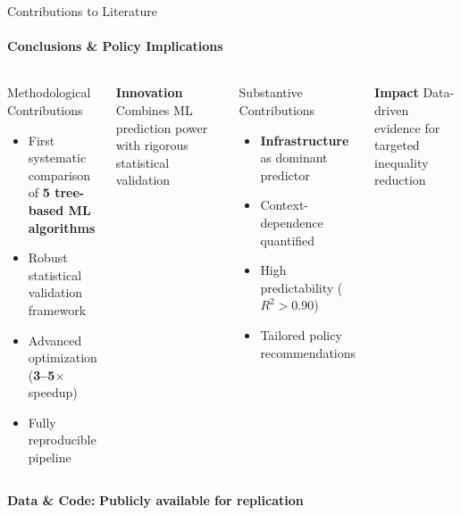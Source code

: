 \documentclass[aspectratio=169,8pt]{beamer}
\begin{document}
    \begin{frame}{Contributions to Literature}
        \framesubtitle{Conclusions \& Policy Implications}
        \begin{columns}[T]
            \begin{exampleblock}{Methodological Contributions}
                \begin{itemize}
                    \item First systematic comparison of \textbf{5 tree-based ML algorithms}
                    \item Robust statistical validation framework
                    \item Advanced optimization (\textbf{3--5$\times$} speedup)
                    \item Fully reproducible pipeline
                \end{itemize}
            \end{exampleblock}

            \vspace{0.15cm}
            \begin{alertblock}{\textbf{Innovation}}
                Combines ML prediction power with rigorous statistical validation
            \end{alertblock}

            \begin{exampleblock}{Substantive Contributions}
                \begin{itemize}
                    \item \textbf{Infrastructure} as dominant predictor
                    \item Context-dependence quantified
                    \item High predictability (\textbf{$R^2 > 0.90$})
                    \item Tailored policy recommendations
                \end{itemize}
            \end{exampleblock}

            \vspace{0.15cm}
            \begin{alertblock}{\textbf{Impact}}
                Data-driven evidence for targeted inequality reduction
            \end{alertblock}
        \end{columns}

        \vspace{0.2cm}
        \begin{center}
            \large\textbf{Data \& Code:} \textcolor{unil-blue}{\textbf{Publicly available for replication}}
        \end{center}
    \end{frame}

    \begin{frame}[plain]
    \end{frame}

\end{document}

